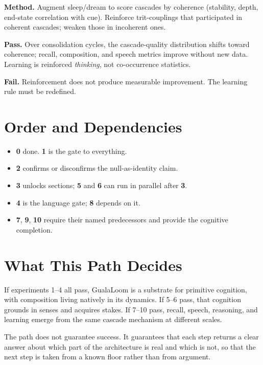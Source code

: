 \documentclass[11pt]{article}
\begin{document}
\textbf{Method.} Augment sleep/dream to score cascades by coherence
(stability, depth, end-state correlation with cue). Reinforce
trit-couplings that participated in coherent cascades; weaken those
in incoherent ones.

\textbf{Pass.} Over consolidation cycles, the cascade-quality
distribution shifts toward coherence; recall, composition, and speech
metrics improve without new data. Learning is reinforced
\emph{thinking}, not co-occurrence statistics.

\textbf{Fail.} Reinforcement does not produce measurable improvement.
The learning rule must be redefined.

\section*{Order and Dependencies}

\begin{itemize}[leftmargin=*]
\item \textbf{0} done. \textbf{1} is the gate to everything.
\item \textbf{2} confirms or disconfirms the null-as-identity claim.
\item \textbf{3} unlocks sections; \textbf{5} and \textbf{6} can run
      in parallel after \textbf{3}.
\item \textbf{4} is the language gate; \textbf{8} depends on it.
\item \textbf{7}, \textbf{9}, \textbf{10} require their named
      predecessors and provide the cognitive completion.
\end{itemize}

\section*{What This Path Decides}

If experiments 1--4 all pass, GualaLoom is a substrate for primitive
cognition, with composition living natively in its dynamics. If
5--6 pass, that cognition grounds in senses and acquires stakes.
If 7--10 pass, recall, speech, reasoning, and learning emerge from
the same cascade mechanism at different scales.

The path does not guarantee success. It guarantees that each step
returns a clear answer about which part of the architecture is real
and which is not, so that the next step is taken from a known floor
rather than from argument.
\end{document}
